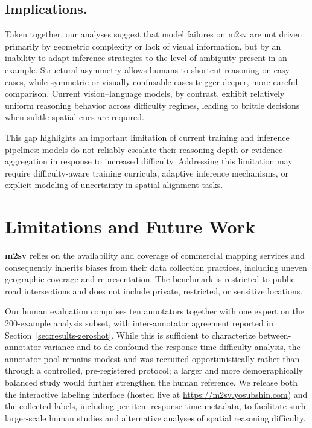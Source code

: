 \documentclass{article}
\begin{document}
\subsection{Implications.}
Taken together, our analyses suggest that model failures on m2sv are not driven
primarily by geometric complexity or lack of visual information, but by an
inability to adapt inference strategies to the level of ambiguity present in an
example. Structural asymmetry allows humans to shortcut reasoning on easy cases,
while symmetric or visually confusable cases trigger deeper, more careful
comparison. Current vision--language models, by contrast, exhibit relatively
uniform reasoning behavior across difficulty regimes, leading to brittle
decisions when subtle spatial cues are required.

This gap highlights an important limitation of current training and inference
pipelines: models do not reliably escalate their reasoning depth or evidence
aggregation in response to increased difficulty. Addressing this limitation may
require difficulty-aware training curricula, adaptive inference mechanisms, or
explicit modeling of uncertainty in spatial alignment tasks.


\section{Limitations and Future Work}
\label{sec:limitations}

\textbf{m2sv} relies on the availability and coverage of commercial mapping services
and consequently inherits biases from their data collection practices, including
uneven geographic coverage and representation. The benchmark is restricted to
public road intersections and does not include private, restricted, or sensitive
locations.

Our human evaluation comprises ten annotators together with one expert on
the 200-example analysis subset, with inter-annotator agreement reported in
Section~\ref{sec:results-zeroshot}. While this is sufficient to characterize
between-annotator variance and to de-confound the response-time difficulty
analysis, the annotator pool remains modest and was recruited opportunistically
rather than through a controlled, pre-registered protocol; a larger and more
demographically balanced study would further strengthen the human reference. We
release both the interactive labeling interface (hosted live at
\url{https://m2sv.yosubshin.com}) and the collected labels, including per-item
response-time metadata, to facilitate such larger-scale human studies and
alternative analyses of spatial reasoning difficulty.
\end{document}
